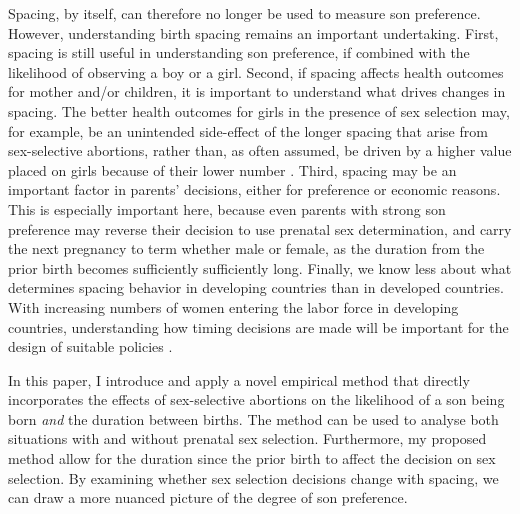 \documentclass[12pt,letterpaper]{article}
\begin{document}
Spacing, by itself, can therefore no longer be used to measure son preference.
However, understanding birth spacing remains an important undertaking.
First, spacing is still useful in understanding son preference, 
if combined with the likelihood of observing a boy or a girl.
Second, if spacing affects health outcomes for mother and/or children, it is 
important to understand what drives changes in spacing.
The better health outcomes for girls in the presence of sex selection may,
for example, be an unintended side-effect of the longer spacing that arise
from sex-selective abortions, rather than, as often assumed, be driven by a 
higher value placed on girls because of their lower number \citep{Lin2014,Hu2015}.
Third, spacing may be an important factor in parents' decisions, either
for preference or economic reasons.
This is especially important here, because even parents with strong
son preference may reverse their decision to use prenatal sex determination, 
and carry the next pregnancy to term whether male or female, as the duration 
from the prior birth becomes sufficiently sufficiently long.
Finally, we know less about what determines spacing behavior in 
developing countries than in developed countries.
With increasing numbers of women entering the labor force in developing
countries, understanding how timing decisions are made will be important
for the design of suitable policies \citep{Portner2018}.


In this paper, I introduce and apply a novel empirical method that directly incorporates 
the effects of sex-selective abortions on the likelihood of a son being born 
\emph{and} the duration between births.
The method can be used to analyse both situations with and without prenatal
sex selection.
Furthermore, my proposed method allow for the duration since the prior 
birth to affect the decision on sex selection.
By examining whether sex selection decisions change with spacing, we can 
draw a more nuanced picture of the degree of son preference.
\end{document}
